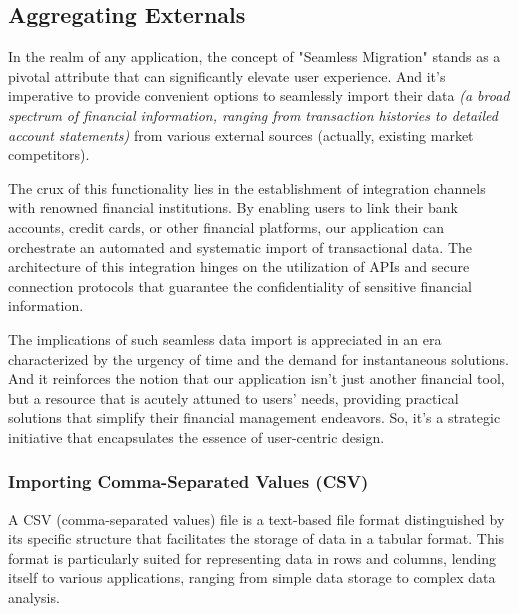 
\subsection{Aggregating Externals}

In the realm of any application, the concept of "Seamless Migration" stands as a pivotal attribute that can 
significantly elevate user experience. And it's imperative to provide convenient options to seamlessly import their 
data \emph{(a broad spectrum of financial information, ranging from transaction histories to detailed account 
statements)} from various external sources (actually, existing market competitors).

The crux of this functionality lies in the establishment of integration channels with renowned financial institutions. 
By enabling users to link their bank accounts, credit cards, or other financial platforms, our application can 
orchestrate an automated and systematic import of transactional data. The architecture of this integration hinges 
on the utilization of APIs and secure connection protocols that guarantee the confidentiality of sensitive financial 
information.

The implications of such seamless data import is appreciated in an era characterized by the urgency of time and the 
demand for instantaneous solutions. And it reinforces the notion that our application isn't just another financial 
tool, but a resource that is acutely attuned to users' needs, providing practical solutions that simplify their 
financial management endeavors. So, it's a strategic initiative that encapsulates the essence of user-centric design. 


\subsubsection{Importing Comma-Separated Values (CSV)}

A CSV (comma-separated values) file is a text-based file format distinguished by its specific structure that facilitates 
the storage of data in a tabular format. This format is particularly suited for representing data in rows and columns, 
lending itself to various applications, ranging from simple data storage to complex data analysis.


